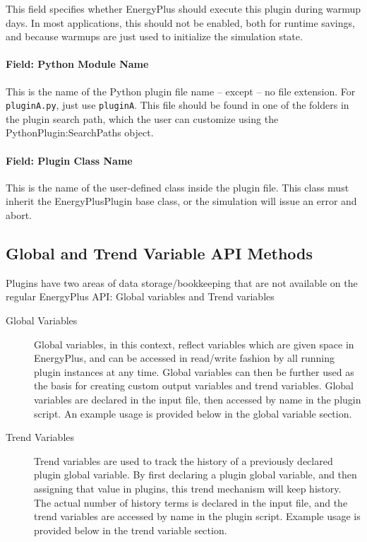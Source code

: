 This field specifies whether EnergyPlus should execute this plugin during warmup days.
In most applications, this should not be enabled, both for runtime savings, and because warmups are just used to initialize the simulation state.

\paragraph{Field: Python Module Name}

This is the name of the Python plugin file name -- except -- no file extension.
For \verb=pluginA.py=, just use \verb=pluginA=.
This file should be found in one of the folders in the plugin search path, which the user can customize using the PythonPlugin:SearchPaths object.

\paragraph{Field: Plugin Class Name}

This is the name of the user-defined class inside the plugin file.
This class must inherit the EnergyPlusPlugin base class, or the simulation will issue an error and abort.

\subsection{Global and Trend Variable API Methods}

Plugins have two areas of data storage/bookkeeping that are not available on the regular EnergyPlus API: Global variables and Trend variables

\begin{description}
    \item[Global Variables] Global variables, in this context, reflect variables which are given space in EnergyPlus, and can be accessed in read/write fashion by all running plugin instances at any time.
    Global variables can then be further used as the basis for creating custom output variables and trend variables.
    Global variables are declared in the input file, then accessed by name in the plugin script.
    An example usage is provided below in the global variable section.
    \item[Trend Variables] Trend variables are used to track the history of a previously declared plugin global variable.
    By first declaring a plugin global variable, and then assigning that value in plugins, this trend mechanism will keep history.
    The actual number of history terms is declared in the input file, and the trend variables are accessed by name in the plugin script.
    Example usage is provided below in the trend variable section.
\end{description}

